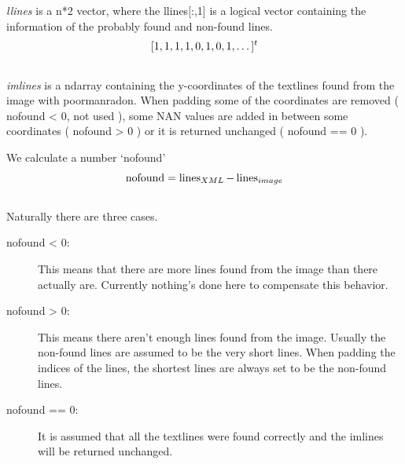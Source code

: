 \documentclass[letterpaper,10pt,english]{sphinxmanual}
\begin{document}
\begin{fulllineitems}
\begin{fulllineitems}
\begin{quote}
\begin{description}
\end{description}\end{quote}

\emph{llines} is a n*2 vector, where the llines{[}:,1{]} is a logical vector 
containing the information of the probably found and non-found lines.
\begin{gather}
\begin{split}[1,1,1,1,0,1,0,1, \dots ]^t\end{split}\notag\\\begin{split}\end{split}\notag
\end{gather}
\emph{imlines} is a ndarray containing the y-coordinates of the textlines 
found from the image with poormanradon. When padding some of the 
coordinates are removed ( nofound \textless{} 0, not used ), some NAN 
values are added in between some coordinates ( nofound \textgreater{} 0 ) or 
it is returned unchanged ( nofound == 0 ).

We calculate a number `nofound'
\begin{gather}
\begin{split}\operatorname{nofound}=\operatorname{lines}_{XML}-\operatorname{lines}_{image}\end{split}\notag\\\begin{split}\end{split}\notag
\end{gather}
Naturally there are three cases.
\begin{description}
\item[{nofound \textless{} 0:}] \leavevmode
This means that there are more lines found from the image than there 
actually are. Currently nothing's done here to compensate this 
behavior.

\item[{nofound \textgreater{} 0:}] \leavevmode
This means there aren't enough lines found from the image. Usually the 
non-found lines are assumed to be the very short lines. When padding 
the indices of the lines, the shortest lines are always set to be 
the non-found lines.

\item[{nofound == 0:}] \leavevmode
It is assumed that all the textlines were found correctly and the 
imlines will be returned unchanged.

\end{description}

\end{fulllineitems}


\end{fulllineitems}
\end{document}
